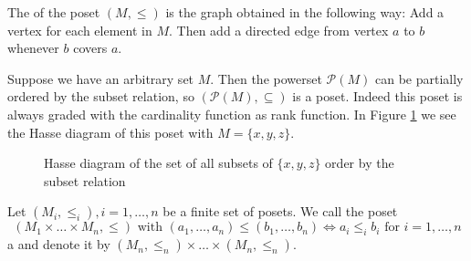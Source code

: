 \begin{defi}
	The  of the poset $(M,\leq)$ is the graph obtained in the following way: Add a vertex for each element in $M$. Then add a directed edge from vertex $a$ to $b$ whenever $b$ covers $a$.
\end{defi}

\begin{exam}
	Suppose we have an arbitrary set $M$. Then the powerset $\mathcal P (M)$ can be partially ordered by the subset relation, so $(\mathcal P (M), \subseteq)$ is a poset. Indeed this poset is always graded with the cardinality function as rank function. In Figure \ref{fig:poset-xyz-subsets} we see the Hasse diagram of this poset with $M = \{x,y,z\}$.

	\begin{figure}[ht]
		\centering
		
		\caption{Hasse diagram of the set of all subsets of $\{x,y,z\}$ order by the subset relation}
		\label{fig:poset-xyz-subsets}
	\end{figure}
\end{exam}

\begin{defi}
	Let $(M_i, \leq_i), i = 1,\ldots,n$ be a finite set of posets. We call the poset
	$$ (M_1 \times \ldots \times M_n,\leq) \textrm{ with } (a_1,\ldots,a_n) \leq (b_1,\ldots,b_n) \iff a_i \leq_i b_i \textrm{ for } i=1,\ldots,n $$
	a  and denote it by $(M_n, \leq_n) \times \ldots \times (M_n, \leq_n)$.
\end{defi}